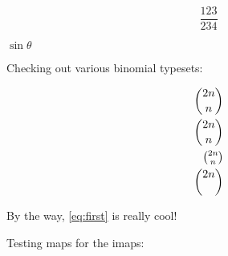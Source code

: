 \documentclass{article}
\begin{document}
\begin{equation}
    \frac{123}{234}
\end{equation}

$\sin\theta$

Checking out various binomial typesets:

\begin{equation}
\begin{split}
    \binom{2n}{n} \\
    \dbinom{2n}{n} \\
    \tbinom{2n}{n} \\
    \dbinom{2n}{}
\end{split}
\end{equation}

By the way, \ref{eq:first} is really cool!

Testing maps for the imaps:


\end{document}
